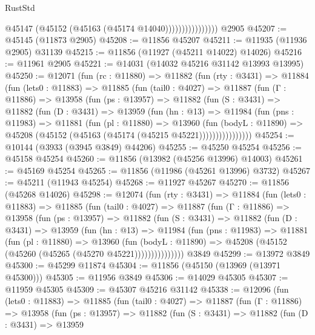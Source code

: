 \begin{lexlean}{RustStd}
\begin{coremodule}
                            @45147 (@45152 (@45163 (@45174 @14040))))))))))))))))
    @2905
@45207 := @45145 (@11873 @2905)
@45208 := @11856 @45207
@45211 := @11935 (@11936 @2905) @31139
@45215 := @11856 (@11927 (@45211 @14022) @14026)
@45216 := @11961 @2905
@45221 := @14031 (@14032 @45216 @31142 @13993 @13995)
@45250 := @12071
    (fun (rc : @11880) =>
    @11882
      (fun (rty : @3431) =>
      @11884
        (fun (lets0 : @11883) =>
        @11885
          (fun (tail0 : @4027) =>
          @11887
            (fun (Γ : @11886) =>
            @13958
              (fun (ps : @13957) =>
              @11882
                (fun (S : @3431) =>
                @11882
                  (fun (D : @3431) =>
                  @13959
                    (fun (hn : @13) =>
                    @11984
                      (fun (pns : @11983) =>
                      @11881
                        (fun (pl : @11880) =>
                        @13960
                          (fun (bodyL : @11890) =>
                          @45208 (@45152 (@45163 (@45174 (@45215 @45221))))))))))))))))
@45254 := @10144 (@3933 (@3945 @3849) @44206)
@45255 := @45250 @45254
@45256 := @45158 @45254
@45260 := @11856 (@13982 (@45256 @13996) @14003)
@45261 := @45169 @45254
@45265 := @11856 (@11986 (@45261 @13996) @3732)
@45267 := @45211 (@11943 @45254)
@45268 := @11927 @45267
@45270 := @11856 (@45268 @14026)
@45298 := @12074
    (fun (rty : @3431) =>
    @11884
      (fun (lets0 : @11883) =>
      @11885
        (fun (tail0 : @4027) =>
        @11887
          (fun (Γ : @11886) =>
          @13958
            (fun (ps : @13957) =>
            @11882
              (fun (S : @3431) =>
              @11882
                (fun (D : @3431) =>
                @13959
                  (fun (hn : @13) =>
                  @11984
                    (fun (pns : @11983) =>
                    @11881
                      (fun (pl : @11880) =>
                      @13960
                        (fun (bodyL : @11890) =>
                        @45208 (@45152 (@45260 (@45265 (@45270 @45221)))))))))))))))
    @3849
@45299 := @13972 @3849
@45300 := @45299 @11874
@45304 := @11856 (@45150 (@13969 (@13971 @45300)))
@45305 := @11956 @3849
@45306 := @14029 @45305
@45307 := @11959 @45305
@45309 := @45307 @45216 @31142
@45338 := @12096
    (fun (lets0 : @11883) =>
    @11885
      (fun (tail0 : @4027) =>
      @11887
        (fun (Γ : @11886) =>
        @13958
          (fun (ps : @13957) =>
          @11882
            (fun (S : @3431) =>
            @11882
              (fun (D : @3431) =>
              @13959

\end{coremodule}
\end{lexlean}
